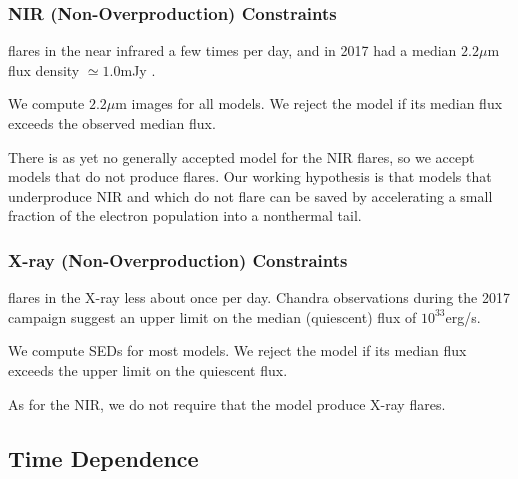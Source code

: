 \subsubsection{NIR (Non-Overproduction) Constraints}

\sgra flares in the near infrared a few times per day, and in 2017 had a median $2.2\mu$m flux density $\simeq 1.0$mJy \citep{2020A&A...638A...2G}.

We compute $2.2\mu$m images for all models.  We reject the model if its median flux exceeds the observed median flux.

There is as yet no generally accepted model for the NIR flares, so we accept models that do not produce flares. Our working hypothesis is that models that underproduce NIR and which do not flare can be saved by accelerating a small fraction of the electron population into a nonthermal tail.

\subsubsection{X-ray (Non-Overproduction) Constraints}

\sgra flares in the X-ray less about once per day.  Chandra observations during the 2017 campaign suggest an upper limit on the median (quiescent) flux of $10^{33}$erg/s.

We compute SEDs for most models.  We reject the model if its median flux exceeds the upper limit on the quiescent flux.

As for the NIR, we do not require that the model produce X-ray flares.

\subsection{Time Dependence}

